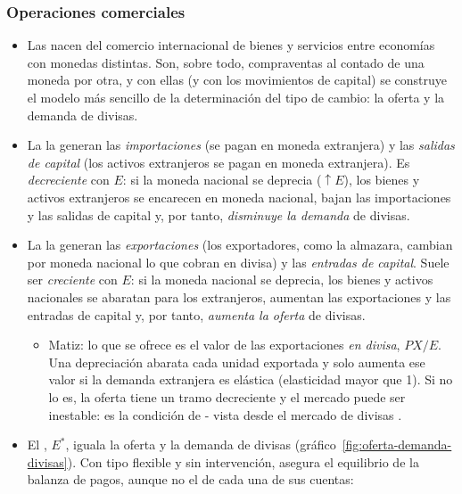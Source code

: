 \documentclass[11pt]{article}
\begin{document}
\subsubsection{Operaciones comerciales}\label{sec:op-comerciales}

\begin{itemize}
\item Las  nacen del comercio internacional de bienes y servicios entre economías con monedas distintas. Son, sobre todo, compraventas al contado de una moneda por otra, y con ellas (y con los movimientos de capital) se construye el modelo más sencillo de la determinación del tipo de cambio: la oferta y la demanda de divisas.
\item La  la generan las \emph{importaciones} (se pagan en moneda extranjera) y las \emph{salidas de capital} (los activos extranjeros se pagan en moneda extranjera). Es \emph{decreciente} con $E$: si la moneda nacional se deprecia ($\uparrow E$), los bienes y activos extranjeros se encarecen en moneda nacional, bajan las importaciones y las salidas de capital y, por tanto, \emph{disminuye la demanda} de divisas.
\item La  la generan las \emph{exportaciones} (los exportadores, como la almazara, cambian por moneda nacional lo que cobran en divisa) y las \emph{entradas de capital}. Suele ser \emph{creciente} con $E$: si la moneda nacional se deprecia, los bienes y activos nacionales se abaratan para los extranjeros, aumentan las exportaciones y las entradas de capital y, por tanto, \emph{aumenta la oferta} de divisas.
  \begin{itemize}
  \item Matiz: lo que se ofrece es el valor de las exportaciones \emph{en divisa}, $PX/E$. Una depreciación abarata cada unidad exportada y solo aumenta ese valor si la demanda extranjera es elástica (elasticidad mayor que 1). Si no lo es, la oferta tiene un tramo decreciente y el mercado puede ser inestable: es la condición de - vista desde el mercado de divisas .
  \end{itemize}
\item El , $E^{*}$, iguala la oferta y la demanda de divisas (gráfico~\ref{fig:oferta-demanda-divisas}). Con tipo flexible y sin intervención, asegura el equilibrio de la balanza de pagos, aunque no el de cada una de sus cuentas:
  \begin{align}

\end{align}
\end{itemize}
\end{document}
